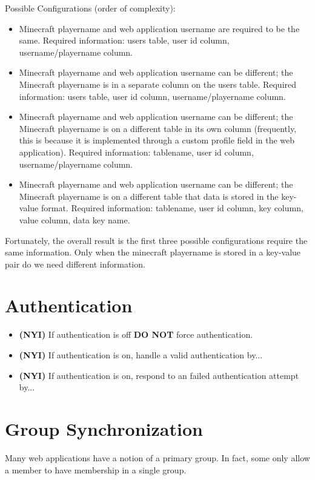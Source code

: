\documentclass[letterpaper,12pt]{article}
\begin{document}
  Possible Configurations (order of complexity):
  \begin{itemize}
    \item Minecraft playername and web application username are required to be
      the same. Required information: users table, user id column,
      username/playername column.
    \item Minecraft playername and web application username can be different;
      the Minecraft playername is in a separate column on the users table.
      Required information: users table, user id column, username/playername
      column.
    \item Minecraft playername and web application username can be different;
      the Minecraft playername is on a different table in its own column
      (frequently, this is because it is implemented through a custom profile
      field in the web application). Required information: tablename, user id
      column, username/playername column.
    \item Minecraft playername and web application username can be different;
      the Minecraft playername is on a different table that data is stored in
      the key-value format. Required information: tablename, user id column,
      key column, value column, data key name.
  \end{itemize}

  Fortunately, the overall result is the first three possible configurations
  require the same information. Only when the minecraft playername is stored in
  a key-value pair do we need different information.
  
  \section{Authentication}
  \begin{itemize}
    \item {\bf (NYI)} If authentication is off {\bf DO NOT} force 
authentication.
    \item {\bf (NYI)} If authentication is on, handle a valid authentication 
by...
    \item {\bf (NYI)} If authentication is on, respond to an failed 
authentication attempt by...
  \end{itemize}

  \section{Group Synchronization}
  Many web applications have a notion of a primary group. In fact, some only
  allow a member to have membership in a single group.
\end{document}
